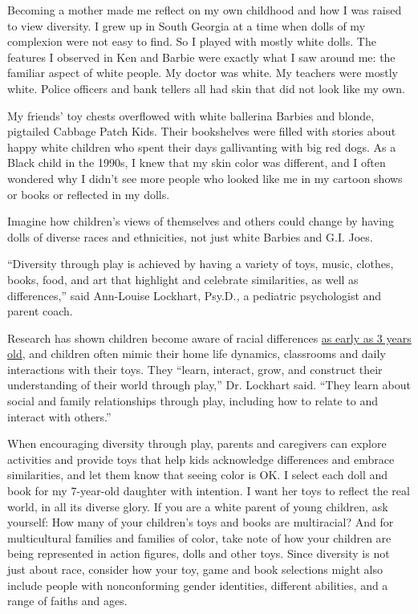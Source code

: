 Becoming a mother made me reflect on my own childhood and how I was
raised to view diversity. I grew up in South Georgia at a time when
dolls of my complexion were not easy to find. So I played with mostly
white dolls. The features I observed in Ken and Barbie were exactly what
I saw around me: the familiar aspect of white people. My doctor was
white. My teachers were mostly white. Police officers and bank tellers
all had skin that did not look like my own.

My friends' toy chests overflowed with white ballerina Barbies and
blonde, pigtailed Cabbage Patch Kids. Their bookshelves were filled with
stories about happy white children who spent their days gallivanting
with big red dogs. As a Black child in the 1990s, I knew that my skin
color was different, and I often wondered why I didn't see more people
who looked like me in my cartoon shows or books or reflected in my
dolls.

Imagine how children's views of themselves and others could change by
having dolls of diverse races and ethnicities, not just white Barbies
and G.I. Joes.

``Diversity through play is achieved by having a variety of toys, music,
clothes, books, food, and art that highlight and celebrate similarities,
as well as differences,'' said Ann-Louise Lockhart, Psy.D.\emph{,} a
pediatric psychologist and parent coach.

Research has shown children become aware of racial differences
\href{https://ncela.ed.gov/files/rcd/BE020476/Play_and_Cultural_Diversity.pdf?origin=publication_detail\#:~:text=The\%20dramatic\%20play\%20area\%20may,reflect\%20different\%20styles\%20of\%20living.}{as
early as 3 years old}, and children often mimic their home life
dynamics, classrooms and daily interactions with their toys. They
``learn, interact, grow, and construct their understanding of their
world through play,'' Dr. Lockhart said. ``They learn about social and
family relationships through play, including how to relate to and
interact with others.''

When encouraging diversity through play, parents and caregivers can
explore activities and provide toys that help kids acknowledge
differences and embrace similarities, and let them know that seeing
color is OK. I select each doll and book for my 7-year-old daughter with
intention. I want her toys to reflect the real world, in all its diverse
glory. If you are a white parent of young children, ask yourself: How
many of your children's toys and books are multiracial? And for
multicultural families and families of color, take note of how your
children are being represented in action figures, dolls and other toys.
Since diversity is not just about race, consider how your toy, game and
book selections might also include people with nonconforming gender
identities, different abilities, and a range of faiths and ages.

